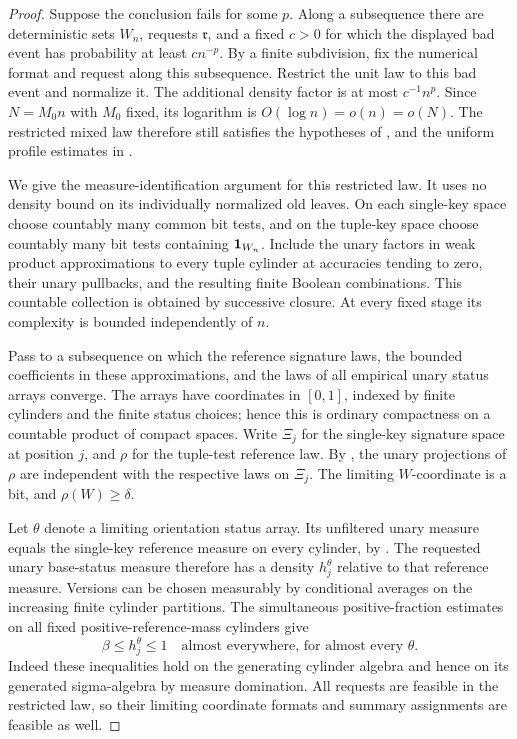 \begin{proof}
Suppose the conclusion fails for some \(p\).  Along a subsequence
there are deterministic sets \(W_n\), requests \(\mathfrak r\), and
a fixed \(c>0\) for which the displayed bad event has probability
at least \(c n^{-p}\).  By a finite subdivision, fix the numerical
format and request along this subsequence.  Restrict the unit law
to this bad event and normalize it.
The additional density factor is at most \(c^{-1}n^p\).
Since \(N=M_0n\) with \(M_0\) fixed, its logarithm is
\(O(\log n)=o(n)=o(N)\).  The restricted mixed law therefore
still satisfies the hypotheses of ,
and the uniform profile estimates in .

We give the measure-identification argument for this restricted law.
It uses no density bound on its individually normalized old leaves.
On each single-key space choose countably many common bit tests,
and on the tuple-key space choose countably many bit tests containing
\(\mathbf 1_{W_n}\).  Include the unary factors in weak product approximations
to every tuple cylinder at accuracies tending to zero, their unary
pullbacks, and the resulting finite Boolean combinations.
This countable collection is obtained by successive closure.
At every fixed stage its complexity is bounded independently of \(n\).

Pass to a subsequence on which the reference signature laws,
the bounded coefficients in these approximations, and the laws of
all empirical unary status arrays converge.
The arrays have coordinates in \([0,1]\), indexed by finite cylinders
and the finite status choices; hence this is ordinary compactness
on a countable product of compact spaces.
Write \(\Xi_j\) for the single-key signature space at position \(j\),
and \(\rho\) for the tuple-test reference law.
By , the unary projections of \(\rho\)
are independent with the respective laws on \(\Xi_j\).
The limiting \(W\)-coordinate is a bit, and
\(\rho(W)\ge\delta\).

Let \(\theta\) denote a limiting orientation status array.
Its unfiltered unary measure equals the single-key reference measure
on every cylinder, by .
The requested unary base-status measure therefore has a density
\(h_j^\theta\) relative to that reference measure.
Versions can be chosen measurably by conditional averages on the
increasing finite cylinder partitions.
The simultaneous positive-fraction estimates on all fixed
positive-reference-mass cylinders give
\begin{equation}
             \beta\le h_j^\theta\le1
 \quad\text{almost everywhere, for almost every }\theta.
 \label{eq:rare-unary-density-lower}
\end{equation}
Indeed these inequalities hold on the generating cylinder algebra
and hence on its generated sigma-algebra by measure domination.
All requests are feasible in the restricted law, so their limiting
coordinate formats and summary assignments are feasible as well.


\end{proof}

